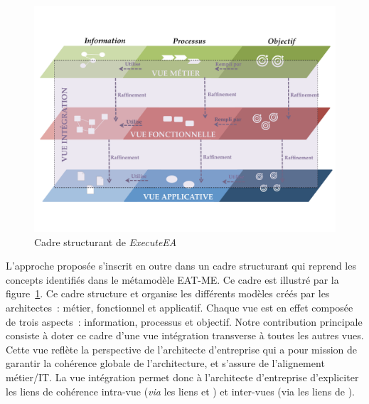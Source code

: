 \begin{figure}[!ht]
 \centering
 \includegraphics[trim= 0cm 2cm 0cm 2cm, clip, width=1\textwidth]{figures/4_demarche/vue_integration.pdf}
 \caption{Cadre structurant de \protect\emph{ExecuteEA}}
 \label{fig:cadre_structurant}
\end{figure}

L'approche proposée s'inscrit en outre dans un cadre structurant qui reprend les concepts identifiés dans le métamodèle
EAT-ME. Ce cadre est illustré par la figure~\ref{fig:cadre_structurant}. Ce cadre structure et organise les différents modèles
créés par les architectes~: métier, fonctionnel et applicatif. Chaque vue est en effet composée de trois aspects~: information,
processus et objectif. Notre contribution principale consiste à doter ce cadre d'une vue intégration transverse à toutes les autres vues.
Cette vue reflète la perspective de l'architecte d'entreprise qui a pour mission de garantir la cohérence globale de l'architecture,
et s'assure de l'alignement métier/IT. La vue intégration permet donc à l’architecte d'entreprise
d'expliciter les liens de cohérence intra-vue (\emph{via} les liens  et ) et inter-vues (via les liens de ).





